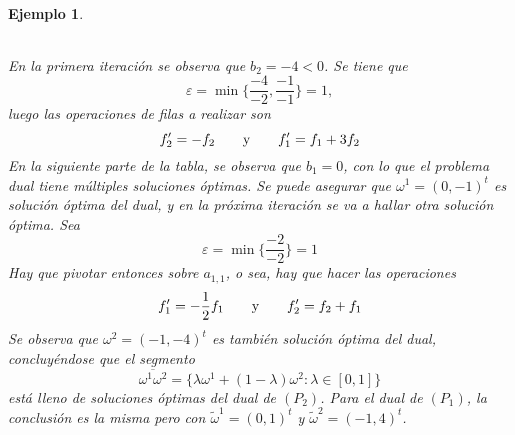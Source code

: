 \documentclass[11pt]{report}
\theoremstyle{mytheorem}
\theoremstyle{mydefinition}
\theoremstyle{myexample}
\newtheorem*{example}{Ejemplo}
\begin{document}
\begin{example}
\begin{center}
\begin{tabular}{|c|c|c|c|c|c|}
    \cline{2-6}
\end{tabular}
\end{center}
En la primera iteración se observa que $b_2 =-4<0$. Se tiene que
\[\varepsilon = \min \biggl\{\frac{-4}{-2},\frac{-1}{-1}\biggr\} = 1,\]
luego las operaciones de filas a realizar son
\[f_2' = -f_2 \qquad \textup{y} \qquad f_1'=f_1+3f_2\]
En la siguiente parte de la tabla, se observa que $b_1 =0$, con lo que el problema dual tiene múltiples soluciones óptimas. Se puede asegurar que $\omega^1 = (0,-1)^t$ es solución óptima del dual, y en la próxima iteración se va a hallar otra solución óptima. Sea
\[\varepsilon = \min \biggl\{\frac{-2}{-2}\biggr\} = 1\]
Hay que pivotar entonces sobre $a_{1,1}$, o sea, hay que hacer las operaciones
\[f_1'=-\frac{1}{2}f_1 \qquad \textup{y} \qquad f_2'= f_2+f_1\]
Se observa que $\omega^2 = (-1,-4)^t$ es también solución óptima del dual, concluyéndose que el segmento
\[\overline{\omega^1\omega^2} = \{\lambda\omega^1+(1-\lambda)\omega^2 \colon \lambda \in [0,1]\}\]
está lleno de soluciones óptimas del dual de $(P_2)$. Para el dual de $(P_1)$, la conclusión es la misma pero con $\tilde{\omega}^1 = (0,1)^t$ y $\tilde{\omega}^2 =(-1,4)^t$.
\end{example}
\end{document}
